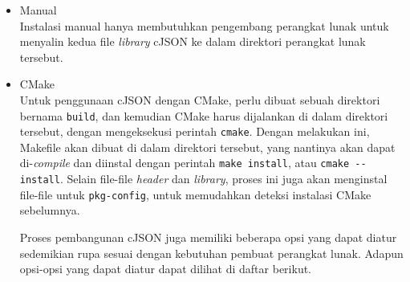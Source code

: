 \begin{itemize}[listparindent=\parindent]
	\item Manual\\
	Instalasi manual hanya membutuhkan pengembang perangkat lunak untuk menyalin kedua file \textit{library} cJSON ke dalam direktori perangkat lunak tersebut.
	\item CMake\\
	Untuk penggunaan cJSON dengan CMake, perlu dibuat sebuah direktori bernama \verb|build|, dan kemudian CMake harus dijalankan di dalam direktori tersebut, dengan mengeksekusi perintah \verb|cmake|. Dengan melakukan ini, Makefile akan dibuat di dalam direktori tersebut, yang nantinya akan dapat di-\textit{compile} dan diinstal dengan perintah \verb|make install|, atau \verb|cmake --install|. Selain file-file \textit{header} dan \textit{library}, proses ini juga akan menginstal file-file untuk \verb|pkg-config|, untuk memudahkan deteksi instalasi CMake sebelumnya.
	
	Proses pembangunan cJSON juga memiliki beberapa opsi yang dapat diatur sedemikian rupa sesuai dengan kebutuhan pembuat perangkat lunak. Adapun opsi-opsi yang dapat diatur dapat dilihat di daftar berikut.


\end{itemize}

